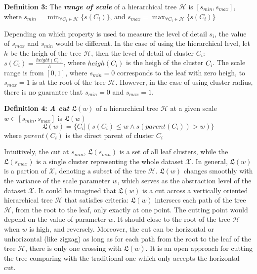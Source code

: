 \textbf{Definition 3:} The \textbf{\textit{range of scale}} of a hierarchical tree $\mathcal{H}$ is $[s_{min},s_{max}]$, where $s_{min} = \min_{\forall C_i \in \mathcal{H}}\{s(C_i)\}$, and $s_{max} = \max_{\forall C_i \in \mathcal{H}}\{s(C_i)\}$

Depending on which property is used to measure the level of detail $s_i$, the value of  $s_{max}$ and  $s_{min}$ would be different. In the case of using the hierarchical level, let $h$ be the heigh of the tree $\mathcal{H}$, then the level of detail of cluster $C_i$: $s(C_i) = \frac{height(C_i)}{h}$, where $heigh(C_i)$ is the heigh of the cluster $C_i$. The scale range is from $[0,1]$, where $s_{min} = 0$ corresponds to the leaf with zero heigh, to $s_{max} = 1$ is at the root of the tree $\mathcal{H}$. However, in the case of using cluster radius, there is no guarantee that $s_{min} = 0$ and $s_{max} = 1$.

\textbf{Definition 4:} \textbf{\textit{A cut $\mathfrak{L}(w)$}} of a hierarchical tree $\mathcal{H}$ at a given scale $w \in [s_{min},s_{max}] $  is $\mathfrak{L}(w)$
\begin{equation}
\label{equ:a_cut_l}
\mathfrak{L}(w) = \{C_i | (s(C_i) \leq w  \wedge s(parent(C_i)) > w)\}
\end{equation}
where $parent(C_i)$ is the direct parent of cluster $C_i$

Intuitively, the cut at $s_{min}$, $\mathfrak{L}(s_{min})$ is a set of all leaf clusters, while the $\mathfrak{L}(s_{max})$ is a single cluster representing the whole dataset $\mathcal{X}$. In general, $\mathfrak{L}(w)$ is a partion of $\mathcal{X}$, denoting a subset of the tree $\mathcal{H}$. $\mathfrak{L}(w)$ changes smoothly with the variance of the scale parameter $w$, which serves as the abstraction level of the dataset $\mathcal{X}$. It could be imagined that $\mathfrak{L}(w)$ is a cut across a vertically oriented hierarchical tree $\mathcal{H}$ that satisfies criteria: $\mathfrak{L}(w)$ intersecs each path of the tree $\mathcal{H}$, from the root to the leaf, only exactly at one point. The cutting point would depend on the value of parameter $w$. It should close to the root of the tree $\mathcal{H}$ when $w$ is high, and reversely. Moreover, the cut can be horizontal or unhorizontal (like zigzag) as long as for each path from the root to the leaf of the tree $\mathcal{H}$, there is only one crossing with $\mathfrak{L}(w)$. It is an open approach for cutting the tree comparing with the traditional one which only accepts the horizontal cut. 


